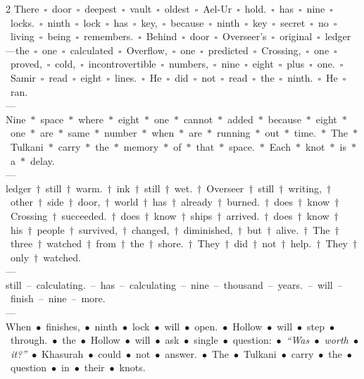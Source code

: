 \documentclass[11pt,letterpaper,twoside]{book}
\begin{document}
\begin{multicols}{2}
There~$\square$~door~$\square$~deepest~$\square$~vault~$\square$~oldest~$\square$~Ael-Ur~$\square$~hold.~$\square$~has~$\square$~nine~$\square$~locks.~$\square$~ninth~$\square$~lock~$\square$~has~$\square$~key,~$\square$~because~$\square$~ninth~$\square$~key~$\square$~secret~$\square$~no~$\square$~living~$\square$~being~$\square$~remembers.~$\square$~Behind~$\square$~door~$\square$~Overseer's~$\square$~original~$\square$~ledger---the~$\square$~one~$\square$~calculated~$\square$~Overflow,~$\square$~one~$\square$~predicted~$\square$~Crossing,~$\square$~one~$\square$~proved,~$\square$~cold,~$\square$~incontrovertible~$\square$~numbers,~$\square$~nine~$\square$~eight~$\square$~plus~$\square$~one.~$\square$~Samir~$\square$~read~$\square$~eight~$\square$~lines.~$\square$~He~$\square$~did~$\square$~not~$\square$~read~$\square$~the~$\square$~ninth.~$\square$~He~$\square$~ran.\\[0.5ex]
---\\
Nine~$\ast$~space~$\ast$~where~$\ast$~eight~$\ast$~one~$\ast$~cannot~$\ast$~added~$\ast$~because~$\ast$~eight~$\ast$~one~$\ast$~are~$\ast$~same~$\ast$~number~$\ast$~when~$\ast$~are~$\ast$~running~$\ast$~out~$\ast$~time.~$\ast$~The~$\ast$~Tulkani~$\ast$~carry~$\ast$~the~$\ast$~memory~$\ast$~of~$\ast$~that~$\ast$~space.~$\ast$~Each~$\ast$~knot~$\ast$~is~$\ast$~a~$\ast$~delay.\\[0.5ex]
---\\
ledger~$\dag$~still~$\dag$~warm.~$\dag$~ink~$\dag$~still~$\dag$~wet.~$\dag$~Overseer~$\dag$~still~$\dag$~writing,~$\dag$~other~$\dag$~side~$\dag$~door,~$\dag$~world~$\dag$~has~$\dag$~already~$\dag$~burned.~$\dag$~does~$\dag$~know~$\dag$~Crossing~$\dag$~succeeded.~$\dag$~does~$\dag$~know~$\dag$~ships~$\dag$~arrived.~$\dag$~does~$\dag$~know~$\dag$~his~$\dag$~people~$\dag$~survived,~$\dag$~changed,~$\dag$~diminished,~$\dag$~but~$\dag$~alive.~$\dag$~The~$\dag$~three~$\dag$~watched~$\dag$~from~$\dag$~the~$\dag$~shore.~$\dag$~They~$\dag$~did~$\dag$~not~$\dag$~help.~$\dag$~They~$\dag$~only~$\dag$~watched.\\[0.5ex]
---\\
still~--~calculating.~--~has~--~calculating~--~nine~--~thousand~--~years.~--~will~--~finish~--~nine~--~more.\\[0.5ex]
---\\
When~$\bullet$~finishes,~$\bullet$~ninth~$\bullet$~lock~$\bullet$~will~$\bullet$~open.~$\bullet$~Hollow~$\bullet$~will~$\bullet$~step~$\bullet$~through.~$\bullet$~the~$\bullet$~Hollow~$\bullet$~will~$\bullet$~ask~$\bullet$~single~$\bullet$~question:~$\bullet$~\textit{``Was~$\bullet$~worth~$\bullet$~it?''}~$\bullet$~Khasurah~$\bullet$~could~$\bullet$~not~$\bullet$~answer.~$\bullet$~The~$\bullet$~Tulkani~$\bullet$~carry~$\bullet$~the~$\bullet$~question~$\bullet$~in~$\bullet$~their~$\bullet$~knots.\\[0.5ex]

\end{multicols}
\end{document}
